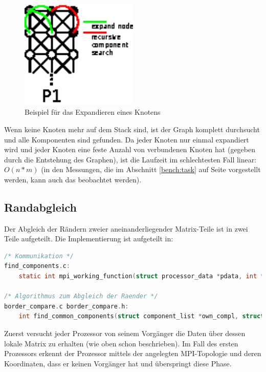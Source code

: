 \begin{figure}[tbhp]
	\centering
	\includegraphics[width=0.5\textwidth]{images/node_expand.eps}
	\caption{Beispiel für das Expandieren eines Knotens}
	\label{fig:node_expand}
\end{figure}

Wenn keine Knoten mehr auf dem Stack sind, ist der Graph komplett durchsucht und alle Komponenten sind gefunden. Da jeder Knoten nur einmal expandiert wird und jeder Knoten eine feste Anzahl von verbundenen Knoten hat (gegeben durch die Entstehung des Graphen), ist die Laufzeit im schlechtesten Fall linear: $O(n*m)$ (in den Messungen, die im Abschnitt \ref{bench:task} auf Seite \pageref{bench:task} vorgestellt werden, kann auch das beobachtet werden).

\subsection{Randabgleich}

Der Abgleich der Rändern zweier aneinanderliegender Matrix-Teile ist in zwei Teile aufgeteilt. Die Implementierung ist aufgeteilt in:

\begin{lstlisting}[language=C, aboveskip=\baselineskip, basicstyle=\footnotesize\ttfamily, lineskip=0pt]
/* Kommunikation */
find_components.c:
	static int mpi_working_function(struct processor_data *pdata, int *dims);

/* Algorithmus zum Abgleich der Raender */
border_compare.c border_compare.h:
	int find_common_components(struct component_list *own_compl, struct component_list *communication_compl, matrix_type *compare_border, matrix_type *send_border, matrix_type *alien_border);
\end{lstlisting}

Zuerst versucht jeder Prozessor von seinem Vorgänger die Daten über dessen lokale Matrix zu erhalten (wie oben schon beschrieben). Im Fall des ersten Prozessors erkennt der Prozessor mittels der angelegten MPI-Topologie und deren Koordinaten, dass er keinen Vorgänger hat und überspringt diese Phase.

